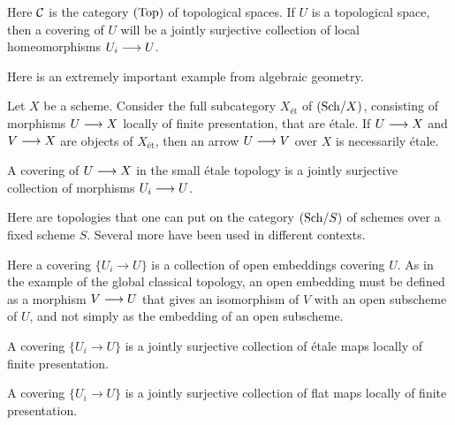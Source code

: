 \begin{2   CONTRAVARIANT FUNCTORS}
\begin{2.3 Sheaves in Grothendieck topologies}
\begin{example}\label{ex:top-global-etale}
Here $\mathcal{C}$ is the category $(\mathrm{Top})$ of topological spaces. If $U$ is a topological space, then a covering of $U$ will be a jointly surjective collection of local homeomorphisms $U_i \arr U$.
\end{example}

Here is an extremely important example from algebraic geometry.

\begin{example}
Let $X$ be a scheme. Consider the full subcategory $X_{\textrm{\'et}}$ of $({\mathrm{Sch}/X})$, consisting of morphisms $U \arr X$ locally of finite presentation, that are \'etale. If $U \arr X$ and $V \arr X$ are objects of $X_{\textrm{\'et}}$, then an arrow $U \arr V$ over $X$ is necessarily \'etale.

A covering of $U \arr X$ in the small \'etale topology is a jointly surjective collection of morphisms $U_i \arr U$.
\end{example}

Here are topologies that one can put on the category $({\mathrm{Sch}/S})$ of schemes over a fixed scheme $S$. Several more have been used in different contexts.

\begin{example}
Here a covering $\{U_i \to U\}$ is a collection of open embeddings covering $U$. As in the example of the global classical topology, an open embedding must be defined as a morphism $V \arr U$ that gives an isomorphism of $V$ with an open subscheme of $U$, and not simply as the embedding of an open subscheme.
\end{example}

\begin{example}
A covering $\{U_i \to U\}$ is a jointly surjective collection  of \'etale maps locally of finite presentation.
\end{example}


\begin{example}
A covering $\{U_i \to U\}$ is a jointly surjective collection of flat maps locally of finite presentation.


\end{example}
\end{2.3 Sheaves in Grothendieck topologies}
\end{2   CONTRAVARIANT FUNCTORS}

